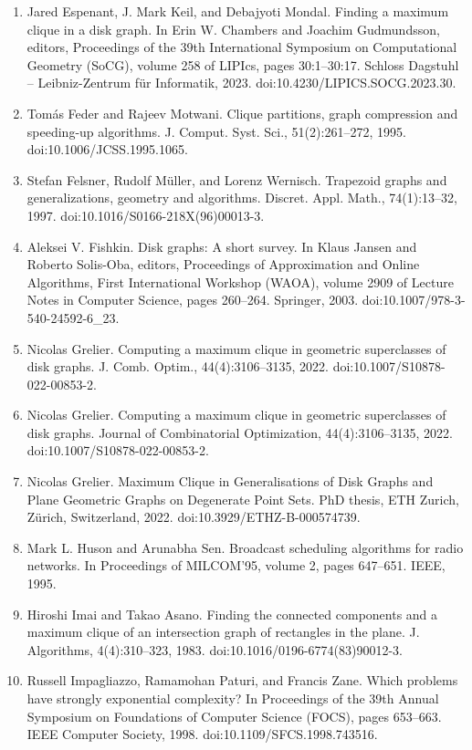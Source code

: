 \documentclass[10pt,a4paper]{amsart}
\begin{document}
\begin{enumerate}
\item[]  [21]  Jared Espenant, J. Mark Keil, and Debajyoti Mondal.  Finding a maximum clique in a disk graph.  In Erin W. Chambers and Joachim Gudmundsson, editors, Proceedings of the 39th International Symposium on Computational Geometry (SoCG), volume 258 of LIPIcs, pages 30:1–30:17. Schloss Dagstuhl – Leibniz-Zentrum für Informatik, 2023.  doi:10.4230/LIPICS.SOCG.2023.30.  
\item[]  [22]  Tomás Feder and Rajeev Motwani.  Clique partitions, graph compression and speeding-up algorithms.  J. Comput. Syst. Sci., 51(2):261–272, 1995.  doi:10.1006/JCSS.1995.1065.  
\item[]  [23]  Stefan Felsner, Rudolf Müller, and Lorenz Wernisch.  Trapezoid graphs and generalizations, geometry and algorithms.  Discret. Appl. Math., 74(1):13–32, 1997.  doi:10.1016/S0166-218X(96)00013-3.  
\item[]  [24]  Aleksei V. Fishkin.  Disk graphs: A short survey.  In Klaus Jansen and Roberto Solis-Oba, editors, Proceedings of Approximation and Online Algorithms, First International Workshop (WAOA), volume 2909 of Lecture Notes in Computer Science, pages 260–264. Springer, 2003.  doi:10.1007/978-3-540-24592-6\_23.  
\item[]  [25]  Nicolas Grelier.  Computing a maximum clique in geometric superclasses of disk graphs.  J. Comb. Optim., 44(4):3106–3135, 2022.  doi:10.1007/S10878-022-00853-2.  
\item[]  [26]  Nicolas Grelier.  Computing a maximum clique in geometric superclasses of disk graphs.  Journal of Combinatorial Optimization, 44(4):3106–3135, 2022.  doi:10.1007/S10878-022-00853-2.  
\item[]  [27]  Nicolas Grelier.  Maximum Clique in Generalisations of Disk Graphs and Plane Geometric Graphs on Degenerate Point Sets.  PhD thesis, ETH Zurich, Zürich, Switzerland, 2022.  doi:10.3929/ETHZ-B-000574739.  
\item[]  [28]  Mark L. Huson and Arunabha Sen.  Broadcast scheduling algorithms for radio networks.  In Proceedings of MILCOM’95, volume 2, pages 647–651. IEEE, 1995.  
\item[]  [29]  Hiroshi Imai and Takao Asano.  Finding the connected components and a maximum clique of an intersection graph of rectangles in the plane.  J. Algorithms, 4(4):310–323, 1983.  doi:10.1016/0196-6774(83)90012-3.  
\item[]  [30]  Russell Impagliazzo, Ramamohan Paturi, and Francis Zane.  Which problems have strongly exponential complexity?  In Proceedings of the 39th Annual Symposium on Foundations of Computer Science (FOCS), pages 653–663. IEEE Computer Society, 1998.  doi:10.1109/SFCS.1998.743516.  

\end{enumerate}
\end{document}
